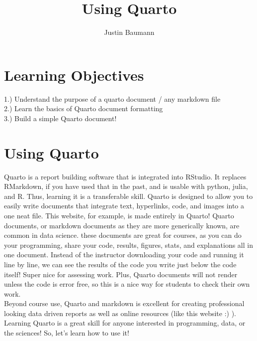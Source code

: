 \documentclass[
  letterpaper,
  DIV=11,
  numbers=noendperiod]{scrartcl}
\title{Using Quarto}
\author{Justin Baumann}
\date{}
\renewcommand*\contentsname{Table of contents}
\newcommand\contentsname{Table of contents}
\begin{document}
\maketitle
\ifdefined\Shaded\renewenvironment{Shaded}{\begin{tcolorbox}[sharp corners, enhanced, frame hidden, boxrule=0pt, interior hidden, breakable, borderline west={3pt}{0pt}{shadecolor}]}{\end{tcolorbox}}\fi

\renewcommand*\contentsname{Table of contents}
{
\hypersetup{linkcolor=}
\setcounter{tocdepth}{3}
\tableofcontents
}
\hypertarget{learning-objectives}{%
\section{\texorpdfstring{\textbf{Learning
Objectives}}{Learning Objectives}}\label{learning-objectives}}

1.) Understand the purpose of a quarto document / any markdown file\\

2.) Learn the basics of Quarto document formatting\\

3.) Build a simple Quarto document!\\

\hypertarget{using-quarto}{%
\section{\texorpdfstring{\textbf{Using
Quarto}}{Using Quarto}}\label{using-quarto}}

Quarto is a report building software that is integrated into RStudio. It
replaces RMarkdown, if you have used that in the past, and is usable
with python, julia, and R. Thus, learning it is a transferable skill.
Quarto is designed to allow you to easily write documents that integrate
text, hyperlinks, code, and images into a one neat file. This website,
for example, is made entirely in Quarto! Quarto documents, or markdown
documents as they are more generically known, are common in data
science. these documents are great for courses, as you can do your
programming, share your code, results, figures, stats, and explanations
all in one document. Instead of the instructor downloading your code and
running it line by line, we can see the results of the code you write
just below the code itself! Super nice for assessing work. Plus, Quarto
documents will not render unless the code is error free, so this is a
nice way for students to check their own work.\\
Beyond course use, Quarto and markdown is excellent for creating
professional looking data driven reports as well as online resources
(like this website :) ). Learning Quarto is a great skill for anyone
interested in programming, data, or the sciences! So, let's learn how to
use it!\\
\end{document}
